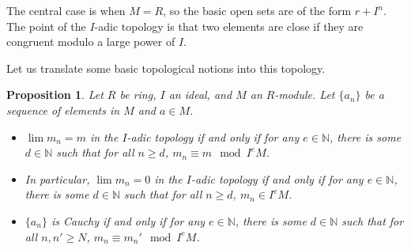 \documentclass{amsart}[12pt]
\newcommand{\N}{\mathbb{N}}
\newcommand{\fm}{{\mathfrak m}}
\numberwithin{equation}{section}
\theoremstyle{plain} %
\newtheorem{prop}[equation]{Proposition}
\theoremstyle{definition}
\newtheorem{defn}[equation]{Definition}
\theoremstyle{remark}
\begin{document}
The central case is when $M=R$, so the basic open sets are of the form $r+I^n$. The point of the $I$-adic topology is that two elements are close if they are congruent modulo a large power of $I$.

Let us translate some basic topological notions into this topology.

\begin{prop} Let $R$ be ring, $I$ an ideal, and $M$ an $R$-module. Let $\{a_n\}$ be a sequence of elements in $M$ and $a\in M$.
\begin{itemize}
\item $\lim m_n = m$ in the $I$-adic topology if and only if for any $e\in \N$, there is some $d\in \N$ such that for all $n\geq d$,  $m_n \equiv m \mod I^e M$.
\item In particular, $\lim m_n = 0$ in the $I$-adic topology if and only if for any $e\in \N$, there is some $d\in \N$ such that for all $n\geq d$,  $m_n \in I^e M$.
\item $\{a_n\}$ is Cauchy if and only if for any $e\in \N$, there is some $d\in \N$ such that for all $n,n'\geq N$,  $m_n \equiv m_n' \mod I^e M$.

\end{itemize}
\end{prop}
\end{document}
